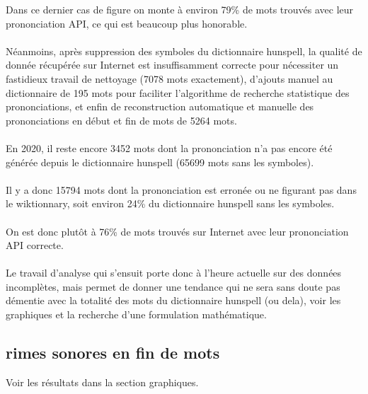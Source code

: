 \documentclass[french]{article}
\begin{document}
Dans ce dernier cas de figure on monte à environ 79\% de mots trouvés avec leur prononciation API, ce qui est beaucoup plus honorable.\\
\\
Néanmoins, après suppression des symboles du dictionnaire hunspell, la qualité de donnée récupérée sur Internet est insuffisamment correcte pour nécessiter un fastidieux travail de nettoyage (7078 mots exactement), d'ajouts manuel au dictionnaire de 195 mots pour faciliter l'algorithme de recherche statistique des prononciations, et enfin de reconstruction automatique et manuelle des prononciations en début et fin de mots de 5264 mots.\\
\\
En 2020, il reste encore 3452 mots dont la prononciation n'a pas encore été générée depuis le dictionnaire hunspell (65699 mots sans les symboles).\\
\\
Il y a donc 15794 mots dont la prononciation est erronée ou ne figurant pas dans le wiktionnary, soit environ 24\% du dictionnaire hunspell sans les symboles.\\
\\
On est donc plutôt à 76\% de mots trouvés sur Internet avec leur prononciation API correcte.\\
\\
Le travail d'analyse qui s'ensuit porte donc à l'heure actuelle sur des données incomplètes, mais permet de donner une tendance qui ne sera sans doute pas démentie avec la totalité des mots du dictionnaire hunspell (ou dela), voir les graphiques et la recherche d'une formulation mathématique.\\
\subsection{rimes sonores en fin de mots}
Voir les résultats dans la section graphiques.\\
\newpage
\end{document}
